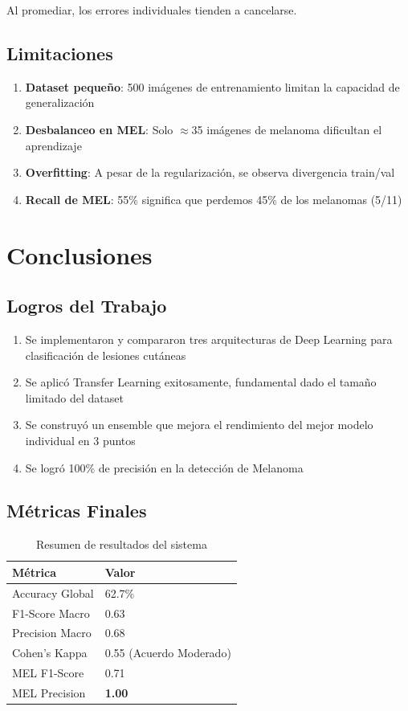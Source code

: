 \documentclass[12pt,a4paper]{article}
\begin{document}
Al promediar, los errores individuales tienden a cancelarse.

\subsection{Limitaciones}

\begin{enumerate}
    \item \textbf{Dataset pequeño}: 500 imágenes de entrenamiento limitan la capacidad de generalización
    \item \textbf{Desbalanceo en MEL}: Solo $\approx$35 imágenes de melanoma dificultan el aprendizaje
    \item \textbf{Overfitting}: A pesar de la regularización, se observa divergencia train/val
    \item \textbf{Recall de MEL}: 55\% significa que perdemos 45\% de los melanomas (5/11)
\end{enumerate}

\section{Conclusiones}

\subsection{Logros del Trabajo}

\begin{enumerate}
    \item Se implementaron y compararon tres arquitecturas de Deep Learning para clasificación de lesiones cutáneas
    \item Se aplicó Transfer Learning exitosamente, fundamental dado el tamaño limitado del dataset
    \item Se construyó un ensemble que mejora el rendimiento del mejor modelo individual en 3 puntos
    \item Se logró 100\% de precisión en la detección de Melanoma
\end{enumerate}

\subsection{Métricas Finales}

\begin{table}[H]
\centering
\caption{Resumen de resultados del sistema}
\begin{tabular}{@{}ll@{}}
\toprule
\textbf{Métrica} & \textbf{Valor} \\
\midrule
Accuracy Global & 62.7\% \\
F1-Score Macro & 0.63 \\
Precision Macro & 0.68 \\
Cohen's Kappa & 0.55 (Acuerdo Moderado) \\
MEL F1-Score & 0.71 \\
MEL Precision & \textbf{1.00} \\
\bottomrule
\end{tabular}
\end{table}
\end{document}
